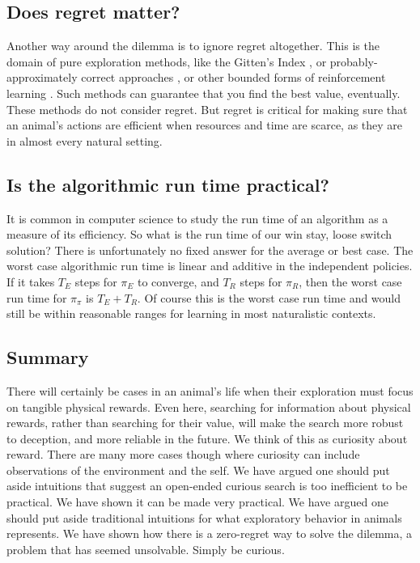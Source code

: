 \subsection*{Does regret matter?}
Another way around the dilemma is to ignore regret altogether. This is the domain of pure exploration methods, like the Gitten’s Index \citep{Gittins1979}, or probably-approximately correct approaches \citep{Valiant1984}, or other bounded forms of reinforcement learning \citep{Brafman2002}. Such methods can guarantee that you find the best value, eventually. These methods do not consider regret. But regret is critical for making sure that an animal's actions are efficient when resources and time are scarce, as they are in almost every natural setting. 


\subsection{Is the algorithmic run time practical?}
It is common in computer science to study the run time of an algorithm as a measure of its efficiency. So what is the run time of our win stay, loose switch solution? There is unfortunately no fixed answer for the average or best case. The worst case algorithmic run time is linear and additive in the independent policies. If it takes $T_E$ steps for $\pi_E$ to converge, and $T_R$ steps for $\pi_R$, then the worst case run time for $\pi_{\pi}$ is $T_E + T_R$. Of course this is the worst case run time and would still be within reasonable ranges for learning in most naturalistic contexts.


\subsection*{Summary}
There will certainly be cases in an animal's life when their exploration must focus on tangible physical rewards. Even here, searching for information about physical rewards, rather than searching for their value, will make the search more robust to deception, and more reliable in the future. We think of this as curiosity about reward. There are many more cases though where curiosity can include observations of the environment and the self. We have argued one should put aside intuitions that suggest an open-ended curious search is too inefficient to be practical. We have shown it can be made very practical. We have argued one should put aside traditional intuitions for what exploratory behavior in animals represents. We have shown how there is a zero-regret way to solve the dilemma, a problem that has seemed unsolvable. Simply be curious.




